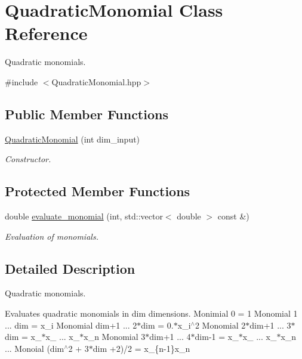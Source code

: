 \hypertarget{class_quadratic_monomial}{}\section{Quadratic\+Monomial Class Reference}
\label{class_quadratic_monomial}


Quadratic monomials.  




{\ttfamily \#include $<$Quadratic\+Monomial.\+hpp$>$}

\subsection*{Public Member Functions}
\begin{DoxyCompactItemize}
\item 
\hyperlink{class_quadratic_monomial_ae0a83eb498e89db8dfbde903b24a0dff}{Quadratic\+Monomial} (int dim\+\_\+input)
\begin{DoxyCompactList}\small\item\em Constructor. \end{DoxyCompactList}\end{DoxyCompactItemize}
\subsection*{Protected Member Functions}
\begin{DoxyCompactItemize}
\item 
double \hyperlink{class_quadratic_monomial_ae92cf5bc1645fc039c61d6e933ce7eeb}{evaluate\+\_\+monomial} (int, std\+::vector$<$ double $>$ const \&)
\begin{DoxyCompactList}\small\item\em Evaluation of monomials. \end{DoxyCompactList}\end{DoxyCompactItemize}


\subsection{Detailed Description}
Quadratic monomials. 

Evaluates quadratic monomials in dim dimensions. Monimial 0 = 1 Monomial 1 ... dim = x\+\_\+i Monomial dim+1 ... 2$\ast$dim = 0.$\ast$x\+\_\+i$^\wedge$2 Monomial 2$\ast$dim+1 ... 3$\ast$dim = x\+\_$\ast$x\+\_ ... x\+\_$\ast$x\+\_\+n Monomial 3$\ast$dim+1 ... 4$\ast$dim-\/1 = x\+\_$\ast$x\+\_ ... x\+\_$\ast$x\+\_\+n ... Monoial (dim$^\wedge$2 + 3$\ast$dim +2)/2 = x\+\_\+\{n-\/1\}x\+\_\+n 


